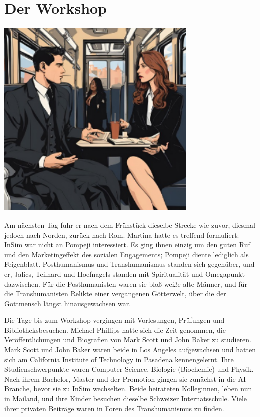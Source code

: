 \documentclass[
]{article}
\begin{document}
\section{Der Workshop}\label{der-workshop}

\includegraphics[width=3.78224in,height=3.82538in]{media/image3.png}

Am nächsten Tag fuhr er nach dem Frühstück dieselbe Strecke wie zuvor,
diesmal jedoch nach Norden, zurück nach Rom. Martina hatte es treffend
formuliert: InSim war nicht an Pompeji interessiert. Es ging ihnen
einzig um den guten Ruf und den Marketingeffekt des sozialen
Engagements; Pompeji diente lediglich als Feigenblatt. Posthumanismus
und Transhumanismus standen sich gegenüber, und er, Jalics, Teilhard und
Hoefnagels standen mit Spiritualität und Omegapunkt dazwischen. Für die
Posthumanisten waren sie bloß weiße alte Männer, und für die
Transhumanisten Relikte einer vergangenen Götterwelt, über die der
Gottmensch längst hinausgewachsen war.

Die Tage bis zum Workshop vergingen mit Vorlesungen, Prüfungen und
Bibliotheksbesuchen. Michael Phillips hatte sich die Zeit genommen, die
Veröffentlichungen und Biografien von Mark Scott und John Baker zu
studieren. Mark Scott und John Baker waren beide in Los Angeles
aufgewachsen und hatten sich am California Institute of Technology in
Pasadena kennengelernt. Ihre Studienschwerpunkte waren Computer Science,
Biologie (Biochemie) und Physik. Nach ihrem Bachelor, Master und der
Promotion gingen sie zunächst in die AI-Branche, bevor sie zu InSim
wechselten. Beide heirateten Kolleginnen, leben nun in Mailand, und ihre
Kinder besuchen dieselbe Schweizer Internatsschule. Viele ihrer privaten
Beiträge waren in Foren des Transhumanismus zu finden.
\end{document}

